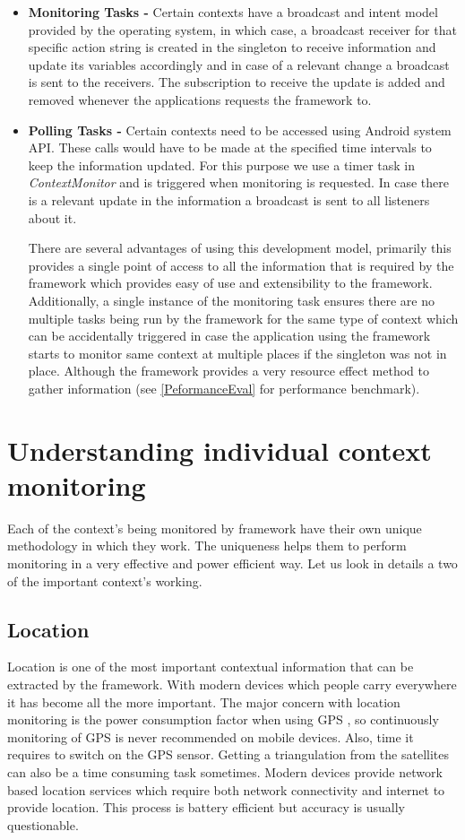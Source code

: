 \documentclass[12pt]{report}
\begin{document}
\begin{itemize}
\item \textbf{Monitoring Tasks - } Certain contexts have a broadcast and intent model provided by the operating system, in which case, a broadcast receiver for that specific action string is created in the singleton to receive information and update its variables accordingly and in case of a relevant change a broadcast is sent to the receivers. The subscription to receive the update is added and removed whenever the applications requests the framework to.

\item \textbf{Polling Tasks - } Certain contexts need to be accessed using Android system API. These calls would have to be made at the specified time intervals to keep the information updated. For this purpose we use a timer task in \textit{ContextMonitor} and is triggered when monitoring is requested. In case there is a relevant update in the information a broadcast is sent to all listeners about it.

There are several advantages of using this development model, primarily this provides a single point of access to all the information that is required by the framework which provides easy of use and extensibility to the framework. Additionally, a single instance of the monitoring task ensures there are no multiple tasks being run by the framework for the same type of context which can be accidentally triggered in case the application using the framework starts to monitor same context at multiple places if the singleton was not in place. Although the framework provides a very resource effect method to gather information (see \ref{PeformanceEval} for performance benchmark).
\end{itemize}


\section{Understanding individual context monitoring}
Each of the context's being monitored by framework have their own unique methodology in which they work. The uniqueness helps them to perform monitoring in a very effective and power efficient way. Let us look in details a two of the important context's working.

\subsection{Location}
Location is one of the most important contextual information that can be extracted by the framework. With modern devices which people carry everywhere it has become all the more important. The major concern with location monitoring is the power consumption factor when using GPS \cite{ben2009less}, so continuously monitoring of GPS is never recommended on mobile devices. Also, time it requires to switch on the GPS sensor. Getting a triangulation from the satellites can also be a time consuming task sometimes. Modern devices provide network based location services which require both network connectivity and internet to provide location. This process is battery efficient but accuracy is usually questionable. 
\end{document}

